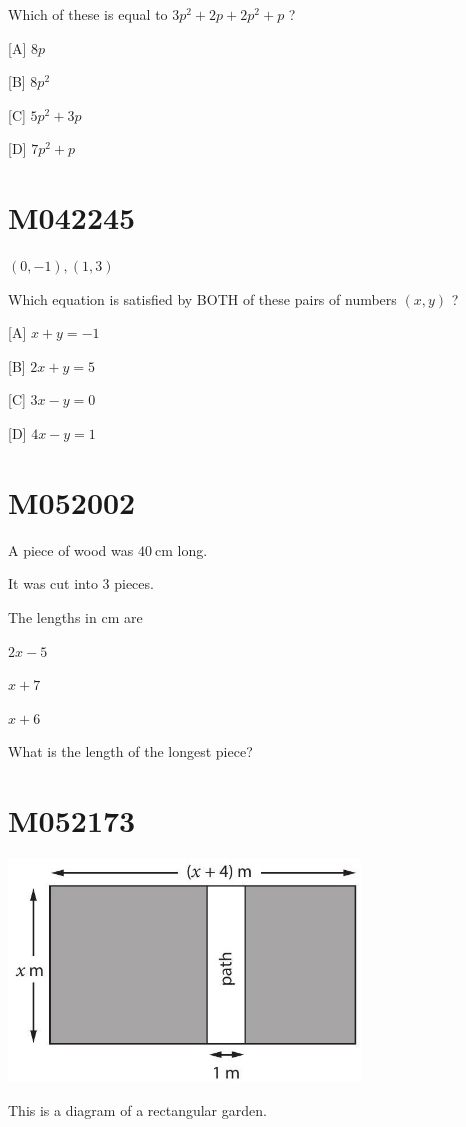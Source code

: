 \documentclass[12pt]{article}
\begin{document}
Which of these is equal to $3 p^{2}+2 p+2 p^{2}+p$ ?

[A] $8 p$

[B] $8 p^{2}$

[C] $5 p^{2}+3 p$

[D] $7 p^{2}+p$

\newpage
\section*{M042245}

$(0,-1),(1,3)$

Which equation is satisfied by BOTH of these pairs of numbers $(x, y)$ ?

[A] $x+y=-1$

[B] $2 x+y=5$

[C] $3 x-y=0$

[D] $4 x-y=1$

\newpage
\section*{M052002}

A piece of wood was $40 \mathrm{~cm}$ long.

It was cut into 3 pieces.

The lengths in $\mathrm{cm}$ are

$2 x-5$

$x+7$

$x+6$

What is the length of the longest piece?

\newpage
\section*{M052173}


\includegraphics[max width=0.7\textwidth]{2024_02_20_828ebc9d68bcc1fbb223g-49}


This is a diagram of a rectangular garden.
\end{document}
